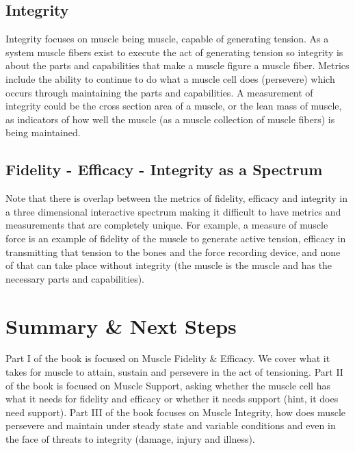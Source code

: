 \subsection{Integrity}
Integrity focuses on muscle being muscle, capable of generating tension. As a system muscle fibers exist to execute the act of generating tension so integrity is about the parts and capabilities that make a muscle figure a muscle fiber. Metrics include the ability to continue to do what a muscle cell does (persevere) which occurs through maintaining the parts and capabilities. A measurement of integrity could be the cross section area of a muscle, or the lean mass of muscle, as indicators of how well the muscle (as a muscle collection of muscle fibers) is being maintained.

\subsection{Fidelity - Efficacy - Integrity as a Spectrum}
Note that there is overlap between the metrics of fidelity, efficacy and integrity in a three dimensional interactive spectrum making it difficult to have metrics and measurements that are completely unique. For example, a measure of muscle force is an example of fidelity of the muscle to generate active tension, efficacy in transmitting that tension to the bones and the force recording device, and none of that can take place without integrity (the muscle is the muscle and has the necessary parts and capabilities).

\section{Summary \& Next Steps}

Part I of the book is focused on Muscle Fidelity \& Efficacy. We cover what it takes for muscle to attain, sustain and persevere in the act of tensioning. Part II of the book is focused on Muscle Support, asking whether the muscle cell has what it needs for fidelity and efficacy or whether it needs support (hint, it does need support). Part III of the book focuses on Muscle Integrity, how does muscle persevere and maintain under steady state and variable conditions and even in the face of threats to integrity (damage, injury and illness).  